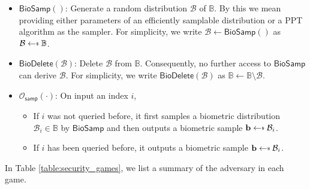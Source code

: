 \begin{itemize}

	\item $\textsf{BioSamp}()$: Generate a random distribution $\mathcal{B}$ of $\mathbb{B}$. By this we mean providing either parameters of an efficiently samplable distribution or a PPT algorithm as the sampler. For simplicity, we write $\mathcal{B} \gets \textsf{BioSamp}()$ as $\mathcal{B} \getsdollar \mathbb{B}$.
	
	\item $\textsf{BioDelete}(\mathcal{B})$: Delete $\mathcal{B}$ from $\mathbb{B}$. Consequently, no further access to $\textsf{BioSamp}$ can derive $\mathcal{B}$. For simplicity, we write $\textsf{BioDelete}(\mathcal{B})$ as $\mathbb{B} \gets \mathbb{B} \setminus \mathcal{B}$.

	\item $\mathcal{O}_\textsf{samp}(\cdot)$: On input an index $i$,
	\begin{itemize}
		\item If $i$ was not queried before, it first samples a biometric distribution $\mathcal{B}_i \in \mathbb{B}$ by $\textsf{BioSamp}$ and then outputs a biometric sample $\mathbf{b} \getsdollar \mathcal{B}_i$.
		\item If $i$ has been queried before, it outputs a biometric sample $\mathbf{b} \getsdollar \mathcal{B}_i$.
	\end{itemize}
\end{itemize}

\iffalse

In Table \ref{table:security_games}, we list a summary of the adversary in each game.

